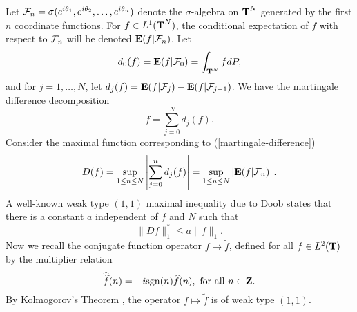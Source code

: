 Let ${\cal F}_n=\sigma(e^{i\theta_1},e^{i\theta_2},\ldots,e^{i\theta_n})$
denote the $\sigma$-algebra on $\T^N$ generated by the first $n$ coordinate functions.
For $f\in L^1(\T^N)$, the conditional expectation of $f$
with respect to ${\cal F}_n$ will be denoted 
$\E(f|\cF_n)$.  Let
$$d_0(f)=\E(f|\cF_0)=\int_{\T^N} fdP,$$
and for $j=1,\ldots, N$, let
$d_j(f)=\E(f|\cF_j)-\E(f|\cF_{j-1})$.
We have the martingale difference decomposition 
\begin{equation}
f=\sum_{j=0}^N d_j(f).
\label{martingale-difference}
\end{equation}
Consider the  
maximal function corresponding to 
(\ref{martingale-difference})
\begin{equation}
D(f)=
\sup_{1\leq n\leq N}
\left|
\sum_{j=0}^n d_j(f)
\right|
=
\sup_{1\leq n\leq N}
\left|
\E(f|\cF_n)
\right|.
\label{max-martingale}
\end{equation}
A well-known weak type $(1,1)$ maximal inequality due to
Doob states that there is 
a constant $a$ independent of $f$ and $N$ such that
\begin{equation}
\|Df\|^*_1\leq a \|f\|_1.
\label{doob's-inequality}
\end{equation}
Now we recall the conjugate function
operator $f\mapsto \widetilde{f}$,
defined for all $f\in L^2(\T)$ by
the multiplier relation
$$\widehat{\widetilde{f}}(n)=-i\sgn (n)\widehat{f}(n),
\ {\rm for\ all}\ n\in \Z. $$
By Kolmogorov's Theorem \cite[Chap.\ IV, Theorem (3.16)]{zyg},
the operator $f\mapsto \widetilde{f}$ is of weak type
$(1,1)$.  

